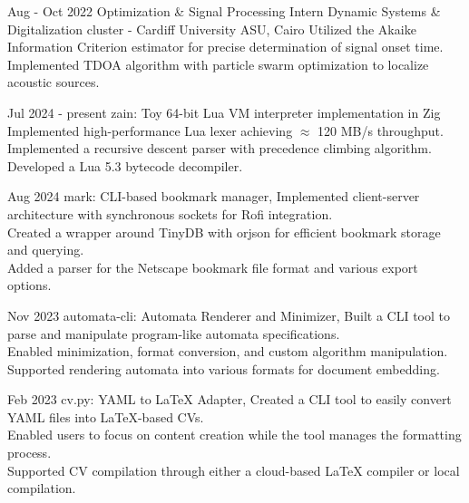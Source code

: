 \documentclass[]{report}
\begin{document}
\entry
    {Aug - Oct 2022}
    {Optimization \& Signal Processing Intern}
    {Dynamic Systems \& Digitalization cluster - Cardiff University}
    {ASU, Cairo}
    {
      \tb Utilized the Akaike Information Criterion estimator for precise determination of signal onset time.\\
      \tb Implemented TDOA algorithm with particle swarm optimization to localize acoustic sources.
    }

\newpage
{}

\entry
    {Jul 2024 - present}
    {zain: Toy 64-bit Lua VM interpreter implementation in Zig}
    {}{}
    {
        \tb Implemented high-performance Lua lexer achieving $\approx$ 120 MB/s throughput.\\
        \tb Implemented a recursive descent parser with precedence climbing algorithm.\\
        \tb Developed a Lua 5.3 bytecode decompiler.
    }


\entry
    {Aug 2024}
    {mark: CLI-based bookmark manager, }
    {} {}
    {
        \tb Implemented client-server architecture with synchronous sockets for Rofi integration.\\
        \tb Created a wrapper around TinyDB with orjson for efficient bookmark storage and querying.\\ 
        \tb Added a parser for the Netscape bookmark file format and various export options.
    }

\entry
    {Nov 2023}
    {automata-cli: Automata Renderer and Minimizer, }
    {} {}
    {
        \tb Built a CLI tool to parse and manipulate program-like automata specifications. \\ 
        \tb Enabled minimization, format conversion, and custom algorithm manipulation. \\ 
        \tb Supported rendering automata into various formats for document embedding.
    }

\entry
    {Feb 2023}
    {cv.py: YAML to LaTeX Adapter, }
    {} {}  
    {
        \tb Created a CLI tool to easily convert YAML files into LaTeX-based CVs.\\
        \tb Enabled users to focus on content creation while the tool manages the formatting process.\\
        \tb Supported CV compilation through either a cloud-based LaTeX compiler or local compilation.
    }
\end{document}
